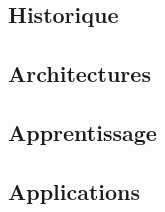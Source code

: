 \subsection{Historique}


\subsection{Architectures}


\subsection{Apprentissage}


\subsection{Applications}


